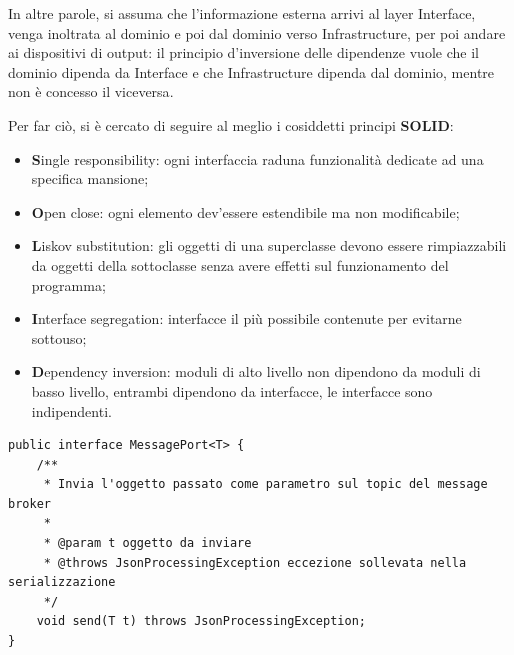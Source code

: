 In altre parole, si assuma che l'informazione esterna arrivi al layer Interface, venga inoltrata al dominio e poi dal dominio verso Infrastructure, per poi andare ai dispositivi di output:
il principio d'inversione delle dipendenze vuole che il dominio dipenda da Interface e che Infrastructure dipenda dal dominio, mentre non è concesso il viceversa\cite{PortAdapterPattern}. 


Per far ciò, si è cercato di seguire al meglio i cosiddetti principi \textbf{SOLID}\cite{SOLID}:
\begin{itemize}
    \item \textbf{S}ingle responsibility: ogni interfaccia raduna funzionalità dedicate ad una specifica mansione;
    \item \textbf{O}pen close: ogni elemento dev'essere estendibile ma non modificabile;
    \item \textbf{L}iskov substitution: gli oggetti di una superclasse devono essere rimpiazzabili da oggetti della sottoclasse senza avere effetti sul funzionamento del programma; 
    \item \textbf{I}nterface segregation: interfacce il più possibile contenute per evitarne sottouso;
    \item \textbf{D}ependency inversion: moduli di alto livello non dipendono da moduli di basso livello, entrambi dipendono da interfacce, le interfacce sono indipendenti.
\end{itemize}
\begin{lstlisting}[style=myJava, 
    caption={Interfaccia MessagePort}, label=lst:messageport, emph={[3] send},
    emphstyle={[3]\color{codeCyan}}]
public interface MessagePort<T> {
    /**
     * Invia l'oggetto passato come parametro sul topic del message broker
     *
     * @param t oggetto da inviare
     * @throws JsonProcessingException eccezione sollevata nella serializzazione
     */
    void send(T t) throws JsonProcessingException;
}
\end{lstlisting}


